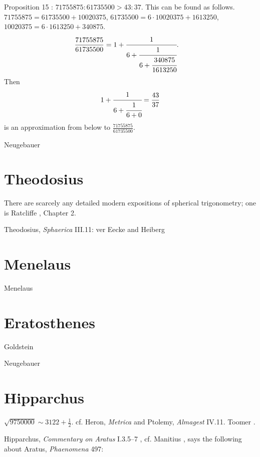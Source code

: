 \documentclass{amsart}
\theoremstyle{definition}
\begin{document}
Proposition 15 \cite[p.~407]{aristarchus}: $71755875:61735500>43:37$. This can be found as follows. 
$71755875 = 61735500+10020375$, $61735500 = 6\cdot 10020375 + 1613250$, $10020375 = 6\cdot 1613250+340875$. 
\begin{align*}
\frac{71755875}{61735500}&=1+\cfrac{1}{6+\cfrac{1}{6+\cfrac{340875}{1613250}}}.
\end{align*}
Then 
\[
1+\cfrac{1}{6+\cfrac{1}{6+0}}=\frac{43}{37}
\]
is an approximation from below to $\frac{71755875}{61735500}$. 



Neugebauer \cite{HAMA}







\section{Theodosius}
There are scarcely any detailed modern expositions of spherical trigonometry; one is Ratcliffe \cite{ratcliffe}, Chapter 2.



Theodosius, {\em Sphaerica} III.11: ver Eecke \cite{theodosius} and Heiberg \cite{heiberg1927}





\section{Menelaus}
Menelaus \cite{menelaos}







\section{Eratosthenes}
Goldstein \cite{goldstein}

Neugebauer \cite[pp.~336, 746--748]{HAMA}





\section{Hipparchus}
$\sqrt{9750000} \sim 3122 + \frac{1}{2}$. cf. Heron, {\em Metrica} \cite[pp.~18--20]{heronisIII}
and Ptolemy, {\em Almagest} IV.11. Toomer \cite[p.~211]{almagest}.

Hipparchus, {\em Commentary on Aratus} I.3.5--7 \cite[p.~]{heidel}, cf. Manitius \cite[p.~27]{manitius}, says
the following about Aratus, {\em Phaenomena} 497:
\end{document}
